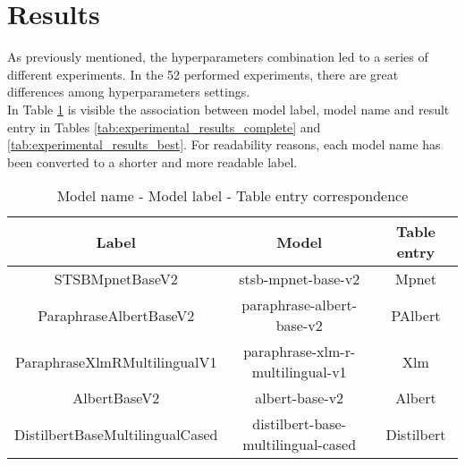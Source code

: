 \documentclass[\main/main.tex]{subfiles}
\begin{document}
\section{Results}
As previously mentioned, the hyperparameters combination led to a series of different experiments. In the 52 performed experiments, there are great differences among hyperparameters settings.\\
In Table \ref{tab:model_name_model_label} is visible the association between model label, model name and result entry in Tables \ref{tab:experimental_results_complete} and \ref{tab:experimental_results_best}. For readability reasons, each model name has been converted to a shorter and more readable label.
\begin{table}[H]
    \centering
    \begin{tabular}{| c | c | c |}
        \hline
        Label & Model & Table entry\\ 
        \hline
        STSBMpnetBaseV2 & stsb-mpnet-base-v2 & Mpnet     \\
        ParaphraseAlbertBaseV2 & paraphrase-albert-base-v2 & PAlbert     \\
        ParaphraseXlmRMultilingualV1 & paraphrase-xlm-r-multilingual-v1 & Xlm    \\
        AlbertBaseV2 & albert-base-v2 & Albert     \\
        DistilbertBaseMultilingualCased & distilbert-base-multilingual-cased & Distilbert     \\ 
        \hline
    \end{tabular}
    \caption{Model name - Model label - Table entry correspondence}
    \label{tab:model_name_model_label}
\end{table}
\end{document}
